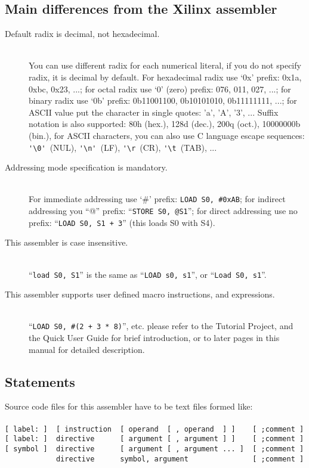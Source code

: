     \subsection{Main differences from the Xilinx assembler}
        \begin{description}
            \item[Default radix is decimal, not hexadecimal.]~\\
                You can use different radix for each numerical literal, if you do not specify radix, it is decimal by default. For hexadecimal radix use `0x' prefix: 0x1a, 0xbc, 0x23, ...; for octal radix use `0' (zero) prefix: 076, 011, 027, ...; for binary radix use `0b' prefix: 0b11001100, 0b10101010, 0b11111111, ...; for ASCII value put the character in single quotes: 'a', 'A', '3', ... Suffix notation is also supported: 80h (hex.), 128d (dec.), 200q (oct.), 10000000b (bin.), for ASCII characters, you can also use C language escape sequences: \verb"'\0'"~(NUL), \verb"'\n'"~(LF), \verb"'\r"~(CR), \verb"'\t"~(TAB), ...
            \item[Addressing mode specification is mandatory.]~\\
                For immediate addressing use `\#' prefix: \texttt{LOAD~S0,~\#0xAB}; for indirect addressing you ``@'' prefix: ``\texttt{STORE~S0,~@S1}''; for direct addressing use no prefix: ``\texttt{LOAD~S0,~S1~+~3}'' (this loads S0 with S4).
            \item[This assembler is case insensitive.]~\\
                ``\texttt{load~S0,~S1}'' is the same as ``\texttt{LOAD~s0,~s1}'', or ``\texttt{Load~S0,~s1}''.
            \item[This assembler supports user defined macro instructions, and expressions.]~\\
                ``\texttt{LOAD~S0,~\#(2~+~3~*~8)}'', etc. please refer to the Tutorial Project, and the Quick User Guide for brief introduction, or to later pages in this manual for detailed description.
        \end{description}

    \subsection{Statements}
        Source code files for this assembler have to be text files formed like:\\
        ~\\
        \verb'[ label: ]  [ instruction  [ operand  [ , operand  ] ]    [ ;comment ]'\\
        \verb'[ label: ]  directive      [ argument [ , argument ] ]    [ ;comment ]'\\
        \verb'[ symbol ]  directive      [ argument [ , argument ... ]  [ ;comment ]'\\
        \verb'            directive      symbol, argument               [ ;comment ]'\\

